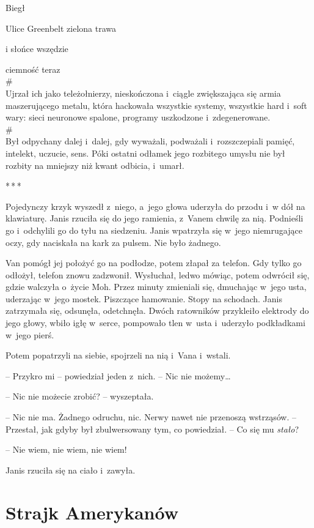 \documentclass[oneside,polish,11pt,sfheadings]{mwbk}
\newcommand{\threeast}{\bigskip\par\centerline{*\,*\,*}\medskip\par}%
\begin{document}
Biegł

Ulice Greenbelt zielona trawa

i słońce wszędzie

ciemność teraz\\

\#\\

Ujrzał ich jako teleżołnierzy, nieskończona i~ciągle zwiększająca się
armia maszerującego metalu, która hackowała wszystkie systemy, wszystkie
hard i~soft wary: sieci neuronowe spalone, programy uszkodzone i~zdegenerowane.\\

\#\\

Był odpychany dalej i~dalej, gdy wyważali, podważali i~rozszczepiali
pamięć, intelekt, uczucie, sens. Póki ostatni odłamek jego rozbitego
umysłu nie był rozbity na mniejszy niż kwant odbicia, i~umarł.
  
  \threeast 

Pojedynczy krzyk wyszedł z~niego, a~jego głowa uderzyła do przodu i~w dół na klawiaturę. Janis rzuciła się do jego ramienia, z~Vanem chwilę za
nią. Podnieśli go i~odchylili go do tyłu na siedzeniu. Janis wpatrzyła
się w~jego niemrugające oczy, gdy naciskała na kark za pulsem. Nie było
żadnego.

Van pomógł jej położyć go na podłodze, potem złapał za telefon. Gdy
tylko go odłożył, telefon znowu zadzwonił. Wysłuchał, ledwo mówiąc,
potem odwrócił się, gdzie walczyła o~życie Moh. Przez minuty zmieniali
się, dmuchając w~jego usta, uderzając w~jego mostek. Piszczące
hamowanie. Stopy na schodach. Janis zatrzymała się, odsunęła,
odetchnęła. Dwóch ratowników przykleiło elektrody do jego głowy, wbiło
igłę w~serce, pompowało tlen w~usta i~uderzyło podkładkami w~jego pierś.

Potem popatrzyli na siebie, spojrzeli na nią i~Vana i~wstali.

-- Przykro mi -- powiedział jeden z~nich. -- Nic nie możemy\ldots

-- Nic nie możecie zrobić? -- wyszeptała.

-- Nic nie ma. Żadnego odruchu, nic. Nerwy nawet nie przenoszą wstrząsów.
-- Przestał, jak gdyby był zbulwersowany tym, co powiedział. -- Co się mu
\emph{stało}?

-- Nie wiem, nie wiem, nie wiem!

Janis rzuciła się na ciało i~zawyła.

\chapter{Strajk Amerykanów}
\end{document}
